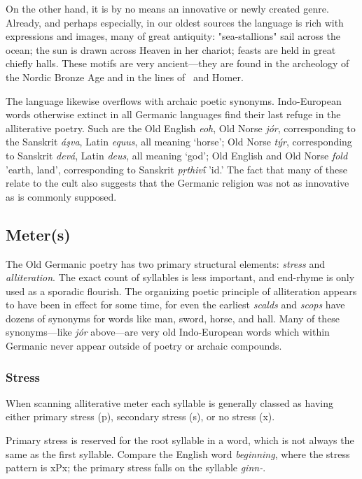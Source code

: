   On the other hand, it is by no means an innovative or newly created genre. Already, and perhaps especially, in our oldest sources the language is rich with expressions and images, many of great antiquity: "sea-stallions" sail across the ocean; the sun is drawn across Heaven in her chariot; feasts are held in great chiefly halls. These motifs are very ancient—they are found in the archeology of the Nordic Bronze Age and in the lines of \Rigveda\ and Homer.

  The language likewise overflows with archaic poetic synonyms.  Indo-European words otherwise extinct in all Germanic languages find their last refuge in the alliterative poetry.  Such are the Old English \emph{eoh}, Old Norse \emph{jór}, corresponding to the Sanskrit \emph{áşva}, Latin \emph{equus}, all meaning ‘horse’; Old Norse \emph{týr}, corresponding to Sanskrit \emph{devá}, Latin \emph{deus}, all meaning ‘god’; Old English and Old Norse \emph{fold} 'earth, land', corresponding to Sanskrit \emph{pṛthivī́} 'id.'  The fact that many of these relate to the cult also suggests that the Germanic religion was not as innovative as is commonly supposed.

  \subsection{Meter(s)}
    The Old Germanic poetry has two primary structural elements: \emph{stress} and \emph{alliteration}.  The exact count of syllables is less important, and end-rhyme is only used as a sporadic flourish.  The organizing poetic principle of alliteration appears to have been in effect for some time, for even the earliest \emph{scalds} and \emph{scops} have dozens of synonyms for words like man, sword, horse, and hall.  Many of these synonyms—like \emph{jór} above—are very old Indo-European words which within Germanic never appear outside of poetry or archaic compounds.

    \subsubsection{Stress}
    When scanning alliterative meter each syllable is generally classed as having either primary stress (p), secondary stress (s), or no stress (x).

    Primary stress is reserved for the root syllable in a word, which is not always the same as the first syllable.  Compare the English word \emph{beginning}, where the stress pattern is xPx; the primary stress falls on the syllable \emph{ginn-}.

